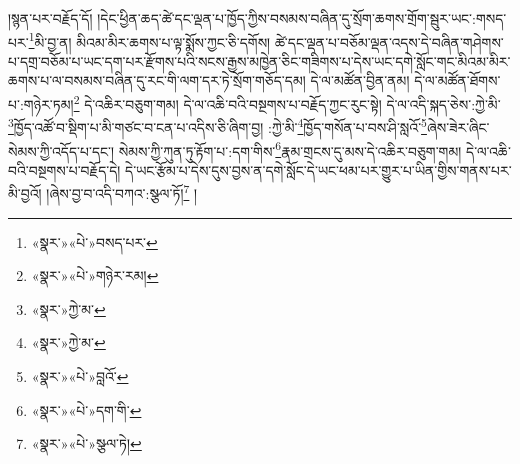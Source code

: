 །སྙན་པར་བརྗོད་དོ། །དེང་ཕྱིན་ཆད་ཚེ་དང་ལྡན་པ་ཁྱོད་ཀྱིས་བསམས་བཞིན་དུ་སྲོག་ཆགས་གྲོག་སྦུར་ཡང་:གསད་པར་\footnote{«སྣར་»«པེ་»བསད་པར་}མི་བྱ་ན། མིའམ་མིར་ཆགས་པ་ལྟ་སྨོས་ཀྱང་ཅི་དགོས། ཚེ་དང་ལྡན་པ་བཅོམ་ལྡན་འདས་དེ་བཞིན་གཤེགས་པ་དགྲ་བཅོམ་པ་ཡང་དག་པར་རྫོགས་པའི་སངས་རྒྱས་མཁྱེན་ཅིང་གཟིགས་པ་དེས་ཡང་དགེ་སློང་གང་མིའམ་མིར་ཆགས་པ་ལ་བསམས་བཞིན་དུ་རང་གི་ལག་དར་ཏེ་སྲོག་གཅོད་དམ། དེ་ལ་མཚོན་བྱིན་ནམ། དེ་ལ་མཚོན་ཐོགས་པ་:གཉེར་ཏམ།\footnote{«སྣར་»«པེ་»གཉེར་རམ།} དེ་འཆིར་བཅུག་གམ། དེ་ལ་འཆི་བའི་བསྔགས་པ་བརྗོད་ཀྱང་རུང་སྟེ། དེ་ལ་འདི་སྐད་ཅེས་:ཀྱེ་མི་\footnote{«སྣར་»ཀྱེ་མ་}ཁྱོད་འཚོ་བ་སྡིག་པ་མི་གཙང་བ་ངན་པ་འདིས་ཅི་ཞིག་བྱ། :ཀྱེ་མི་\footnote{«སྣར་»ཀྱེ་མ་}ཁྱོད་གསོན་པ་བས་ཤི་སླའོ་\footnote{«སྣར་»«པེ་»བླའོ་}ཞེས་ཟེར་ཞིང་སེམས་ཀྱི་འདོད་པ་དང་། སེམས་ཀྱི་ཀུན་ཏུ་རྟོག་པ་:དག་གིས་\footnote{«སྣར་»«པེ་»དག་གི་}རྣམ་གྲངས་དུ་མས་དེ་འཆིར་བཅུག་གམ། དེ་ལ་འཆི་བའི་བསྔགས་པ་བརྗོད་དེ། དེ་ཡང་རྩོམ་པ་དེས་དུས་བྱས་ན་དགེ་སློང་དེ་ཡང་ཕམ་པར་གྱུར་པ་ཡིན་གྱིས་གནས་པར་མི་བྱའོ། །ཞེས་བྱ་བ་འདི་བཀའ་:སྩལ་ཏོ།\footnote{«སྣར་»«པེ་»སྩལ་ཏེ།} །

